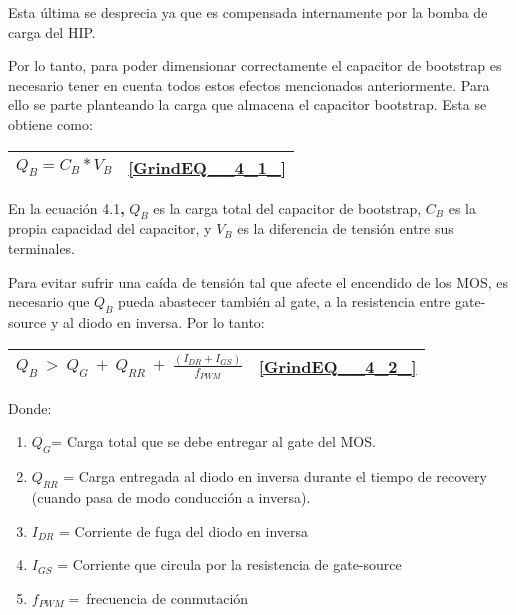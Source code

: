 \documentclass{article} %
\begin{document}
\noindent Esta \'{u}ltima se desprecia ya que es compensada internamente por la bomba de carga del HIP.

\noindent 

\noindent Por lo tanto, para poder dimensionar correctamente el capacitor de bootstrap es necesario tener en cuenta todos estos efectos mencionados anteriormente. Para ello se parte planteando la carga que almacena el capacitor bootstrap. Esta se obtiene como:

\noindent 

\begin{tabular}{|p{3.9in}|p{0.4in}|} \hline 
$Q_B=C_B*V_B$ & \eqref{GrindEQ__4_1_} \\ \hline 
\end{tabular}



\noindent En la ecuaci\'{o}n 4.1\textbf{,} $Q_B$ es la carga total del capacitor de bootstrap, $C_B$ es la propia capacidad del capacitor, y $V_B$ es la diferencia de  tensi\'{o}n entre sus terminales. 

\noindent 

\noindent Para evitar sufrir una ca\'{i}da de tensi\'{o}n tal que afecte el encendido de los MOS, es necesario que $Q_B$ pueda abastecer tambi\'{e}n al gate, a la resistencia entre gate-source y al diodo en inversa. Por lo tanto:

\begin{tabular}{|p{3.9in}|p{0.4in}|} \hline 
$Q_B{\ >\ Q}_G\ +\ Q_{RR}\ +\ \frac{(I_{DR}+I_{GS})}{f_{PWM}}$ & \eqref{GrindEQ__4_2_}  \\ \hline 
\end{tabular}



\noindent Donde:

\begin{enumerate}
\item  $Q_G$= Carga total que se debe entregar al gate del MOS.

\item  $Q_{RR}$ = Carga entregada al diodo en inversa durante el tiempo de recovery (cuando pasa de modo conducci\'{o}n a inversa).

\item  $I_{DR}$ = Corriente de fuga del diodo en inversa

\item  $I_{GS}$ = Corriente que circula por la resistencia de gate-source

\item  $f_{PWM}=\ $frecuencia de conmutaci\'{o}n
\end{enumerate}
\end{document}
